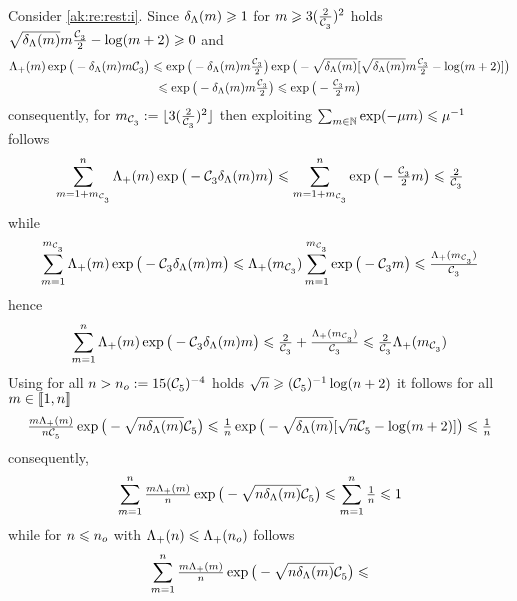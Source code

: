 \begin{pro}
Consider \ref{ak:re:rest:i}.
  Since $\cmiSv\geq1$ for
  $\Di\geq3(\tfrac{2}{\cst{3}})^2$ holds
  $\sqrt{\cmSv}\Di\tfrac{\cst{3}}{2}-\log(\Di+2)\geq0$
  and%
  \begin{multline*}
    \miSv\exp\big(-\cmSv\Di\cst{3}\big)\leq
    \exp\big(-\cmSv\Di\tfrac{\cst{3}}{2}\big)
    \exp\big(-\sqrt{\cmSv}[\sqrt{\cmSv}\Di\tfrac{\cst{3}}{2}-\log(\Di+2)]\big)\\
    \leq\exp\big(-\cmSv\Di\tfrac{\cst{3}}{2}\big)
    \leq\exp\big(-\tfrac{\cst{3}}{2}\Di\big)
  \end{multline*}
  consequently, for
  $\Di_{\cst{3}}:=\floor{3(\tfrac{2}{\cst{3}})^2}$ then exploiting
  $\sum_{\Di\in\Nz}\exp(-\mu\Di)\leq \mu^{-1}$ follows
  \begin{displaymath}
    \sum_{\Di=1+\Di_{\cst{3}}}^{\ssY}\miSv\exp\big(-\cst{3} \cmSv \Di\big)\leq
    \sum_{\Di=1+\Di_{\cst{3}}}^{\ssY}\exp\big(-\tfrac{\cst{3}}{2}\Di\big)
    \leq \tfrac{2}{\cst{3}}
  \end{displaymath}
  while
  \begin{displaymath}
   \sum_{\Di=1}^{\Di_{\cst{3}}}\miSv\exp\big(-\cst{3}\cmSv\Di\big)\leq
   \miSv[\Di_{\cst{3}}]\sum_{\Di=1}^{\Di_{\cst{3}}}\exp\big(-\cst{3}\Di\big)
   \leq \tfrac{\miSv[\Di_{\cst{3}}]}{\cst{3}}
 \end{displaymath}
 hence
 \begin{displaymath}
   \sum_{\Di=1}^{\ssY}\miSv\exp\big(-\cst{3}\cmSv\Di\big)\leq
   \tfrac{2}{\cst{3}}+\tfrac{\miSv[\Di_{\cst{3}}]}{\cst{3}}\leq \tfrac{2}{\cst{3}}\miSv[\Di_{\cst{3}}]
 \end{displaymath}
 Using for all $ \ssY>\ssY_{o}:=15({\cst{5}})^{-4}$ holds 
 $\sqrt{n}\geq{(\cst{5})^{-1}}\log(n+2)$ it follows for all $\Di\in\nset{1,n}$
 \begin{displaymath}
   \tfrac{\Di\miSv}{\ssY\cst{5}}\exp\big(-\sqrt{n\cmSv}\cst{5}\big)
   \leq
   \tfrac{1}{\ssY}\exp\big(-\sqrt{\cmSv}[\sqrt{\ssY}\cst{5}-\log(\Di+2)]\big)\leq \tfrac{1}{\ssY}
 \end{displaymath}
 consequently, 
 \begin{equation*}
   \sum_{\Di=1}^{\ssY}\tfrac{\Di\miSv}{\ssY}\exp\big(-\sqrt{n\cmSv}\cst{5}\big)
   \leq\sum_{\Di=1}^{\ssY}\tfrac{1}{\ssY}\leq1
 \end{equation*}
 while for $\ssY\leq \ssY_{o}$ with
 $\miSv[\ssY]\leq\miSv[\ssY_{o}]$ follows
\begin{equation*}
   \sum_{\Di=1}^{\ssY}\tfrac{\Di\miSv}{\ssY}\exp\big(-\sqrt{\ssY\cmSv}\cst{5}\big)\leq 

\end{equation*}
\end{pro}
